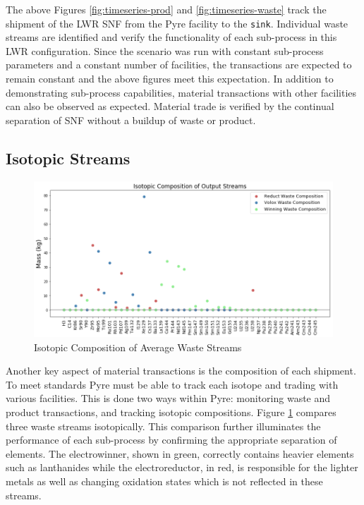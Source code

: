 The above Figures \ref{fig:timeseries-prod} and \ref{fig:timeseries-waste} track the shipment of the LWR SNF from the Pyre facility to the \texttt{sink}.
Individual waste streams are identified and verify the functionality of each sub-process in this LWR configuration. Since the scenario was run with
constant sub-process parameters and a constant number of facilities, the transactions are expected to remain constant and the above figures meet this expectation.
In addition to demonstrating sub-process capabilities, material transactions with other \Cyclus facilities can also be observed as expected. Material trade is verified by the continual separation of SNF without a buildup of waste or product.

\subsection{Isotopic Streams}
\begin{figure} [h]
	\includegraphics[width=\linewidth]{images/avg-isotope-comp}
	\caption{Isotopic Composition of Average Waste Streams}
	\label{fig:avg-isotope-comp}
\end{figure}

Another key aspect of material transactions is the composition of each shipment. To meet \Cyclus standards Pyre must be able to track each isotope and trading with various facilities. This is done two ways within Pyre: monitoring waste and product transactions, and tracking isotopic compositions.
Figure \ref{fig:avg-isotope-comp} compares three waste streams isotopically. This comparison further illuminates the performance of each sub-process by confirming the appropriate separation of elements.
The electrowinner, shown in green, correctly contains heavier elements such as lanthanides while the electroreductor, in red, is responsible for the lighter metals
as well as changing oxidation states which is not reflected in these streams.

